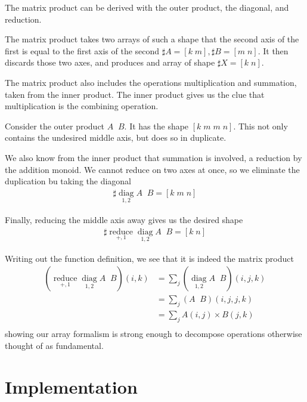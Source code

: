 \documentclass{DIKU-report-variant}
\newcommand\mrm[1]{\mathrm{#1}}
\newcommand\brm[1]{\bm{\mrm{#1}}}
\newcommand\reduce{\operatorname*{\brm{reduce}}}
\newcommand\diag{\operatorname*{\brm{diag}}}
\newcommand\oprodby[1]{\mathop{\coprod_{#1}}}
\begin{document}
\begin{example}
  \label{ex:matrix-product}
  The matrix product can be derived with the outer product,
  the diagonal, and reduction.

  The matrix product takes two arrays of such a shape that the
  second axis of the first is equal to the first axis of the second
  \(\sharp A = [k\; m], \sharp B = [m\; n]\). It then discards those
  two axes, and produces and array of shape \(\sharp X = [k\; n]\).

  The matrix product also includes the operations multiplication and
  summation, taken from the inner product. The inner product gives us
  the clue that multiplication is the combining operation.

  Consider the outer product \(A \oprodby\times B\). It has the
  shape \([k\;m\;m\;n]\). This not only contains the undesired middle axis,
  but does so in duplicate.

  We also know from the inner product that summation is involved, a reduction
  by the addition monoid. We cannot reduce on two axes at once, so we eliminate
  the duplication bu taking the diagonal
  \begin{align*}
    \sharp \diag_{1,2} A \oprodby\times B = [k\;m\;n]
  \end{align*}

  Finally, reducing the middle axis away gives us the desired shape
  \begin{align*}
  \sharp \reduce_{+,1} \diag_{1,2} A \oprodby\times B = [k\;n]
  \end{align*}

  Writing out the function definition, we see that it is indeed the matrix product
  \begin{align*}
    \left(\reduce_{+,1} \diag_{1,2} A \oprodby\times B\right) (i, k)
    &= \sum_{j} \left(\diag_{1,2} A \oprodby\times B\right) (i, j, k) \\
    &= \sum_{j} \left(A \oprodby\times B\right) (i, j, j, k) \\
    &= \sum_{j} A(i, j) \times B(j, k) \\
  \end{align*}
  showing our array formalism is strong enough to decompose operations
  otherwise thought of as fundamental.
\end{example}

\chapter{Implementation}
\end{document}
